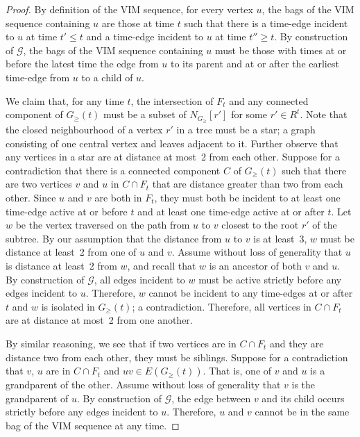 \documentclass[a4paper,UKenglish,cleveref, autoref, thm-restate]{lipics-v2021} %
\begin{document}
\begin{toappendix}
\begin{proof}
    By definition of the VIM sequence, for every vertex $u$, the bags of the VIM sequence containing $u$ are those at time $t$ such that there is a time-edge incident to $u$ at time $t'\leq t$ and a time-edge incident to $u$ at time $t''\geq t$. By construction of $\mathcal{G}$, the bags of the VIM sequence containing $u$ must be those with times at or before the latest time the edge from $u$ to its parent and at or after the earliest time-edge from $u$ to a child of $u$. 
    
    We claim that, for any time $t$, the intersection of $F_t$ and any connected component of $G_{\geq}(t)$ must be a subset of $N_{G_{\geq}}[r']$ for some $r'\in R^t$. Note that the closed neighbourhood of a vertex $r'$ in a tree must be a star; a graph consisting of one central vertex and leaves adjacent to it. Further observe that any vertices in a star are at distance at most~2 from each other.
    Suppose for a contradiction that there is a connected component $C$ of $G_{\geq}(t)$ such that there are two vertices $v$ and $u$ in $C\cap F_t$ that are distance greater than two from each other. Since $u$ and $v$ are both in $F_t$, they must both be incident to at least one time-edge active at or before $t$ and at least one time-edge active at or after $t$. Let $w$ be the vertex traversed on the path from $u$ to $v$ closest to the root $r'$ of the subtree. By our assumption that the distance from $u$ to $v$ is at least~3, $w$ must be distance at least~2 from one of $u$ and $v$. Assume without loss of generality that $u$ is distance at least~2 from $w$, and recall that $w$ is an ancestor of both $v$ and $u$. By construction of $\mathcal{G}$, all edges incident to $w$ must be active strictly before any edges incident to $u$. Therefore, $w$ cannot be incident to any time-edges at or after $t$ and $w$ is isolated in $G_{\geq}(t)$; a contradiction. Therefore, all vertices in $C\cap F_t$ are at distance at most~2 from one another. 
    
    By similar reasoning, we see that if two vertices are in $C\cap F_t$ and they are distance two from each other, they must be siblings. Suppose for a contradiction that $v$, $u$ are in $C\cap F_t$ and $uv\in E(G_{\geq}(t))$. That is, one of $v$ and $u$ is a grandparent of the other. Assume without loss of generality that $v$ is the grandparent of $u$. By construction of $\mathcal{G}$, the edge between $v$ and its child occurs strictly before any edges incident to $u$. Therefore, $u$ and $v$ cannot be in the same bag of the VIM sequence at any time.
    

\end{proof}
\end{toappendix}
\end{document}
